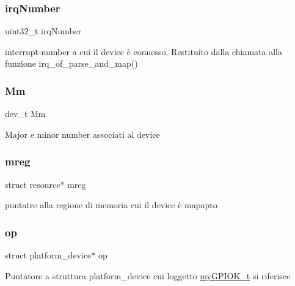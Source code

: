 \subsubsection{\texorpdfstring{irq\+Number}{irqNumber}}
{\footnotesize\ttfamily uint32\+\_\+t irq\+Number}

interrupt-\/number a cui il device è connesso. Restituito dalla chiamata alla funzione irq\+\_\+of\+\_\+parse\+\_\+and\+\_\+map() \mbox{\label{structmy_g_p_i_o_k__t_aeb60fb4e41b5f11f70ebe969361884f4}} 
\subsubsection{\texorpdfstring{Mm}{Mm}}
{\footnotesize\ttfamily dev\+\_\+t Mm}

Major e minor number associati al device \mbox{\label{structmy_g_p_i_o_k__t_a18c4eb95350c67ccb239a8a39c43c09a}} 
\subsubsection{\texorpdfstring{mreg}{mreg}}
{\footnotesize\ttfamily struct resource$\ast$ mreg}

puntatre alla regione di memoria cui il device è mapapto \mbox{\label{structmy_g_p_i_o_k__t_a3a7801058bef8fbe4a2cec3c9579cd70}} 
\subsubsection{\texorpdfstring{op}{op}}
{\footnotesize\ttfamily struct platform\+\_\+device$\ast$ op}

Puntatore a struttura platform\+\_\+device cui l\textquotesingle{}oggetto \hyperlink{structmy_g_p_i_o_k__t}{my\+G\+P\+I\+O\+K\+\_\+t} si riferisce \mbox{\label{structmy_g_p_i_o_k__t_a2080617f88cafd765430573afe7701d1}} 
